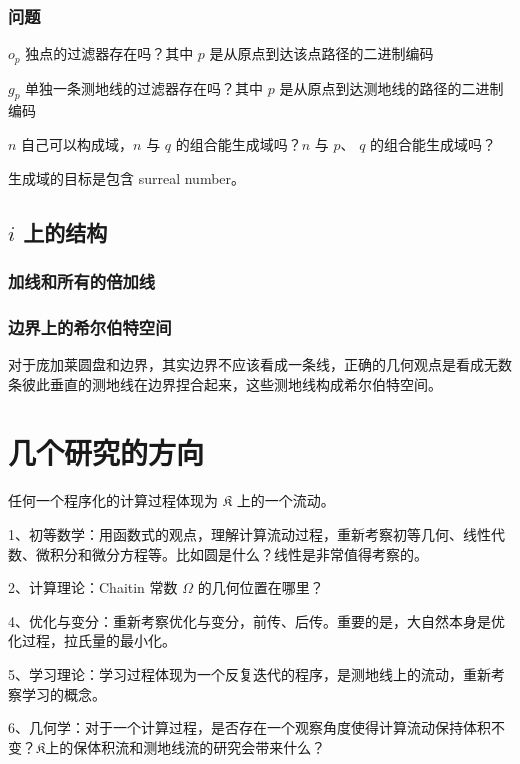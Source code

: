 \documentclass[a4paper,12pt]{article}
\begin{document}
\subsubsection{问题}

$o_p$ 独点的过滤器存在吗？其中 $p$ 是从原点到达该点路径的二进制编码

$g_p$ 单独一条测地线的过滤器存在吗？其中 $p$ 是从原点到达测地线的路径的二进制编码

$n$ 自己可以构成域，$n$ 与 $q$ 的组合能生成域吗？$n$ 与 $p$、 $q$ 的组合能生成域吗？

生成域的目标是包含 surreal number。

\subsection{$i$ 上的结构}

\subsubsection{加线和所有的倍加线}

\subsubsection{边界上的希尔伯特空间}

对于庞加莱圆盘和边界，其实边界不应该看成一条线，正确的几何观点是看成无数条彼此垂直的测地线在边界捏合起来，这些测地线构成希尔伯特空间。

\newpage

\section{几个研究的方向}

任何一个程序化的计算过程体现为 $\mathfrak{K}$ 上的一个流动。

1、初等数学：用函数式的观点，理解计算流动过程，重新考察初等几何、线性代数、微积分和微分方程等。比如圆是什么？线性是非常值得考察的。

2、计算理论：Chaitin 常数 $\Omega$ 的几何位置在哪里？

4、优化与变分：重新考察优化与变分，前传、后传。重要的是，大自然本身是优化过程，拉氏量的最小化。

5、学习理论：学习过程体现为一个反复迭代的程序，是测地线上的流动，重新考察学习的概念。

6、几何学：对于一个计算过程，是否存在一个观察角度使得计算流动保持体积不变？$\mathfrak{K}$上的保体积流和测地线流的研究会带来什么？
\end{document}
